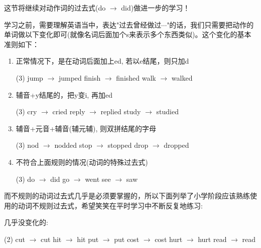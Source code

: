 \documentclass[a4paper]{article}
\begin{document}
这节将继续对动作词的过去式(do $\rightarrow$ did)做进一步的学习！

学习之前，需要理解英语当中，表达"过去曾经做过$\cdots$"的话，我们只需要把动作的单词做以下变化即可(就像名词后面加个s来表示多个东西类似)。这个变化的基本准则如下：

\begin{enumerate}
 \item 正常情况下，是在动词后面加上ed, 若以e结尾，则只加d

 \begin{tasks}[style=itemize](3)
  \task jump $\rightarrow$ jumped
  \task finish $\rightarrow$ finished
  \task walk $\rightarrow$ walked
 \end{tasks}

 \item 辅音+y结尾的，把y变i, 再加ed

 \begin{tasks}[style=itemize](3)
  \task cry $\rightarrow$ cried
  \task reply $\rightarrow$ replied
  \task study $\rightarrow$ studied
 \end{tasks}


 \item 辅音+元音+辅音(辅元辅), 则双拼结尾的字母

 \begin{tasks}[style=itemize](3)
  \task nod $\rightarrow$ nodded
  \task stop $\rightarrow$ stopped
  \task drop $\rightarrow$ dropped
 \end{tasks}

 \item 不符合上面规则的情况(动词的特殊过去式)

 \begin{tasks}[style=itemize](3)
  \task do $\rightarrow$ did
  \task go $\rightarrow$ went
  \task see $\rightarrow$ saw
 \end{tasks}

\end{enumerate}

而不规则的动词过去式几乎是必须要掌握的，所以下面列举了小学阶段应该熟练使用的动词不规则过去式，希望笑笑在平时学习中不断反复地练习:

几乎没变化的: 

\begin{tasks}[style=enumerate](2)
  \task cut $\rightarrow$ cut
  \task hit  $\rightarrow$ hit
  \task put  $\rightarrow$ put
  \task cost  $\rightarrow$ cost
  \task hurt  $\rightarrow$ hurt
  \task read  $\rightarrow$ read
\end{tasks}
\end{document}
